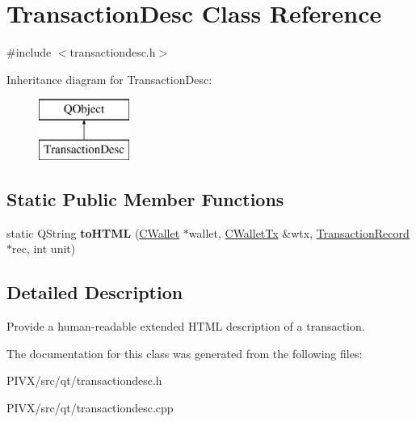 \hypertarget{class_transaction_desc}{}\section{Transaction\+Desc Class Reference}
\label{class_transaction_desc}


{\ttfamily \#include $<$transactiondesc.\+h$>$}

Inheritance diagram for Transaction\+Desc\+:\begin{figure}[H]
\begin{center}
\leavevmode
\includegraphics[height=2.000000cm]{class_transaction_desc}
\end{center}
\end{figure}
\subsection*{Static Public Member Functions}
\begin{DoxyCompactItemize}
\item 
\mbox{\label{class_transaction_desc_ab7c9dbb2048aae121dd9d75df86e64f4}} 
static Q\+String {\bfseries to\+H\+T\+ML} (\mbox{\hyperlink{class_c_wallet}{C\+Wallet}} $\ast$wallet, \mbox{\hyperlink{class_c_wallet_tx}{C\+Wallet\+Tx}} \&wtx, \mbox{\hyperlink{class_transaction_record}{Transaction\+Record}} $\ast$rec, int unit)
\end{DoxyCompactItemize}


\subsection{Detailed Description}
Provide a human-\/readable extended H\+T\+ML description of a transaction. 

The documentation for this class was generated from the following files\+:\begin{DoxyCompactItemize}
\item 
P\+I\+V\+X/src/qt/transactiondesc.\+h\item 
P\+I\+V\+X/src/qt/transactiondesc.\+cpp\end{DoxyCompactItemize}
